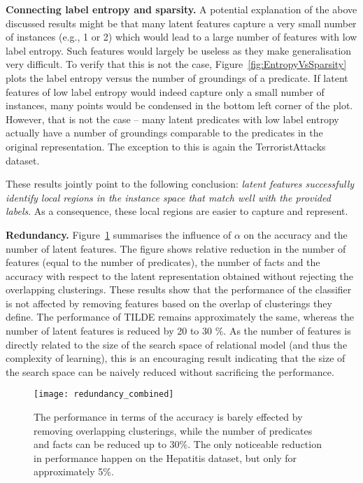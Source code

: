 \textbf{Connecting label entropy and sparsity.}
A potential explanation of the above discussed results might be that many latent features capture a very small number of instances (e.g., 1 or 2) which would lead to a large number of features with low label entropy.
Such features would largely be useless as they make generalisation very difficult.
To verify that this is not the case, Figure~\ref{fig:EntropyVsSparsity} plots the label entropy versus the number of groundings of a predicate.
If latent features of low label entropy would indeed capture only a small number of instances, many points would be condensed in the bottom left corner of the plot.
However, that is not the case -- many latent predicates with low label entropy actually have a number of groundings comparable to the predicates in the original representation.
The exception to this is again the TerroristAttacks dataset.

These results jointly point to the following conclusion: \textit{latent features successfully identify local regions in the instance space that match well with the provided labels}.
As a consequence, these local regions are easier to capture and represent.









\textbf{Redundancy.}
Figure~\ref{fig:Redundancy} summarises the influence of $\alpha$ on the accuracy and the number of latent features.
The figure shows relative reduction in the number of features (equal to the number of predicates), the number of facts and the accuracy with  respect to the latent representation obtained without rejecting the overlapping clusterings.
These results show that the performance of the classifier is not affected by removing features based on the overlap of clusterings they define.
The performance of TILDE remains approximately the same, whereas the number of latent features is reduced by 20 to 30 \%.
As the number of features is directly related to the size of the search space of relational model (and thus the complexity of learning), this is an encouraging result indicating that the size of the search space can be naively reduced without sacrificing the performance.








\begin{figure}[t]
	\centering
	\medskip
    \texttt{[image: redundancy\_combined]}
    \caption[Redundancy in latent representations created by \gls{curled}]{The performance in terms of the accuracy is barely effected by removing overlapping clusterings, while the number of predicates and facts can be reduced up to 30\%. The only noticeable reduction in performance happen on the Hepatitis dataset, but only for approximately 5\%.   }
    \label{fig:Redundancy}
\end{figure}








